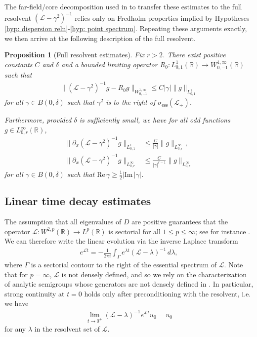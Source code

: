 \documentclass[11pt]{article}
\newcommand{\R}{\mathbb{R}}
\newcommand{\mcl}{\mathcal{L}}
\renewcommand{\Re}{\mathrm{Re} \,}
\renewcommand{\Im}{\mathrm{Im} \,}
\newtheorem{prop}{Proposition}
\numberwithin{equation}{section}
\numberwithin{prop}{section}
\begin{document}
The far-field/core decomposition used in \cite{SIMA, CAMS} to transfer these estimates to the full resolvent $(\mcl - \gamma^2)^{-1}$ relies only on Fredholm properties implied by Hypotheses \ref{hyp: dispersion reln}-\ref{hyp: point spectrum}. Repeating these arguments exactly, we then arrive at the following description of the full resolvent.
\begin{prop}[Full resolvent estimates]\label{p: full resolvent estimates}
	Fix $r > 2$. There exist positive constants $C$ and $\delta$ and a bounded limiting operator $R_0 : L^1_{0,1} (\R) \to W^{1,\infty}_{0, -1} (\R)$ such that
	\begin{align}
	\| (\mcl - \gamma^2)^{-1} g - R_0 g \|_{W^{1, \infty}_{0, -1}} \leq C |\gamma| \| g \|_{L^1_{0,1}}
	\end{align}
	for all $\gamma \in B(0,\delta)$ such that $\gamma^2$ is to the right of $\sigma_\mathrm{ess}(\mcl_+)$. 
	
	Furthermore, provided $\delta$ is sufficiently small, we have for all odd functions $g \in L^\infty_{0, r}(\R)$, 
	\begin{align}
	\| \partial_x (\mcl-\gamma^2)^{-1} g \|_{L^1_{0,1}} &\leq \frac{C}{|\gamma|} \| g \|_{L^\infty_{0, r}}, \\
	\| \partial_x (\mcl - \gamma^2)^{-1} g \|_{L^\infty_{0, r}} &\leq \frac{C}{|\gamma|^{r-1}} \| g \|_{L^\infty_{0,r}}
	\end{align}
	for all $\gamma \in B(0,\delta)$ such that $\Re \gamma \geq \frac{1}{2} | \Im |\gamma|$. 
\end{prop}

\subsection{Linear time decay estimates}
The assumption that all eigenvalues of $D$ are positive guarantees that the operator $\mcl : W^{2,p} (\R) \to L^p(\R)$ is sectorial for all $1 \leq p \leq \infty$; see for instance \cite[Chapter 3]{Lunardi}. We can therefore write the linear evolution via the inverse Laplace transform
\begin{align}
	e^{\mcl t} = - \frac{1}{2 \pi i} \int_\Gamma e^{\lambda t} (\mcl - \lambda)^{-1} \, d \lambda,
\end{align}
where $\Gamma$ is a sectorial contour to the right of the essential spectrum of $\mcl$. Note that for $p = \infty$, $\mcl$ is not densely defined, and so we rely on the characterization of analytic semigroups whose generators are not densely defined in \cite{Lunardi}. In particular, strong continuity at $t = 0$ holds only after preconditioning with the resolvent, i.e. we have
\begin{align}
\lim_{t \to 0^+} (\mcl - \lambda)^{-1} e^{\mcl t} u_0 = u_0 \label{e: initial data}
\end{align}
for any $\lambda$ in the resolvent set of $\mcl$. 
\end{document}
